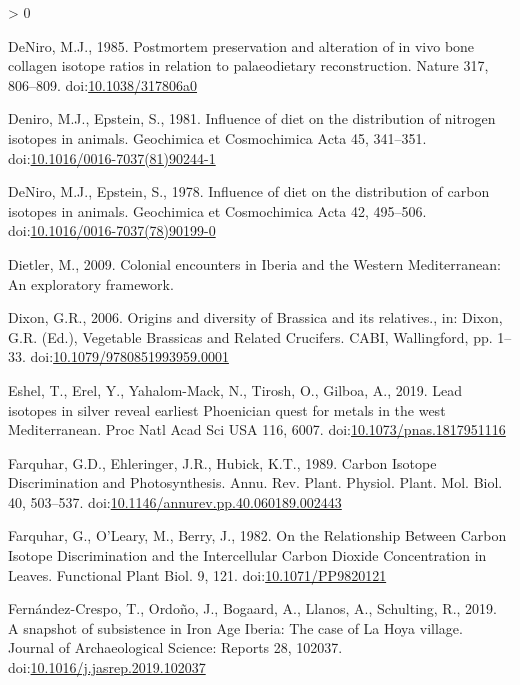\documentclass[5p]{elsarticle} %
\newlength{\cslhangindent}
\newenvironment{CSLReferences}[2] %
 {%
  \setlength{\parindent}{0pt}
  \ifodd #1 \everypar{\setlength{\hangindent}{\cslhangindent}}\ignorespaces\fi
  \ifnum #2 > 0
  \setlength{\parskip}{#2\baselineskip}
  \fi
 }%
 {}
\begin{document}
\begin{CSLReferences}{1}{0}
\leavevmode\hypertarget{ref-deniro85}{}%
DeNiro, M.J., 1985. Postmortem preservation and alteration of in vivo bone collagen isotope ratios in relation to palaeodietary reconstruction. Nature 317, 806--809. doi:\href{https://doi.org/10.1038/317806a0}{10.1038/317806a0}

\leavevmode\hypertarget{ref-deniro_epstein81}{}%
Deniro, M.J., Epstein, S., 1981. Influence of diet on the distribution of nitrogen isotopes in animals. Geochimica et Cosmochimica Acta 45, 341--351. doi:\href{https://doi.org/10.1016/0016-7037(81)90244-1}{10.1016/0016-7037(81)90244-1}

\leavevmode\hypertarget{ref-deniro_epstein78}{}%
DeNiro, M.J., Epstein, S., 1978. Influence of diet on the distribution of carbon isotopes in animals. Geochimica et Cosmochimica Acta 42, 495--506. doi:\href{https://doi.org/10.1016/0016-7037(78)90199-0}{10.1016/0016-7037(78)90199-0}

\leavevmode\hypertarget{ref-dietler09}{}%
Dietler, M., 2009. Colonial encounters in {Iberia} and the {Western Mediterranean}: {An} exploratory framework.

\leavevmode\hypertarget{ref-dixon06}{}%
Dixon, G.R., 2006. Origins and diversity of {Brassica} and its relatives., in: Dixon, G.R. (Ed.), Vegetable Brassicas and Related Crucifers. {CABI}, {Wallingford}, pp. 1--33. doi:\href{https://doi.org/10.1079/9780851993959.0001}{10.1079/9780851993959.0001}

\leavevmode\hypertarget{ref-eshel_etal19}{}%
Eshel, T., Erel, Y., Yahalom-Mack, N., Tirosh, O., Gilboa, A., 2019. Lead isotopes in silver reveal earliest {Phoenician} quest for metals in the west {Mediterranean}. Proc Natl Acad Sci USA 116, 6007. doi:\href{https://doi.org/10.1073/pnas.1817951116}{10.1073/pnas.1817951116}

\leavevmode\hypertarget{ref-farquhar_etal89}{}%
Farquhar, G.D., Ehleringer, J.R., Hubick, K.T., 1989. Carbon {Isotope Discrimination} and {Photosynthesis}. Annu. Rev. Plant. Physiol. Plant. Mol. Biol. 40, 503--537. doi:\href{https://doi.org/10.1146/annurev.pp.40.060189.002443}{10.1146/annurev.pp.40.060189.002443}

\leavevmode\hypertarget{ref-farquhar_etal82}{}%
Farquhar, G., O'Leary, M., Berry, J., 1982. On the {Relationship Between Carbon Isotope Discrimination} and the {Intercellular Carbon Dioxide Concentration} in {Leaves}. Functional Plant Biol. 9, 121. doi:\href{https://doi.org/10.1071/PP9820121}{10.1071/PP9820121}

\leavevmode\hypertarget{ref-fernandez-crespo_etal19}{}%
Fernández-Crespo, T., Ordoño, J., Bogaard, A., Llanos, A., Schulting, R., 2019. A snapshot of subsistence in {Iron Age Iberia}: {The} case of {La Hoya} village. Journal of Archaeological Science: Reports 28, 102037. doi:\href{https://doi.org/10.1016/j.jasrep.2019.102037}{10.1016/j.jasrep.2019.102037}


\end{CSLReferences}
\end{document}
